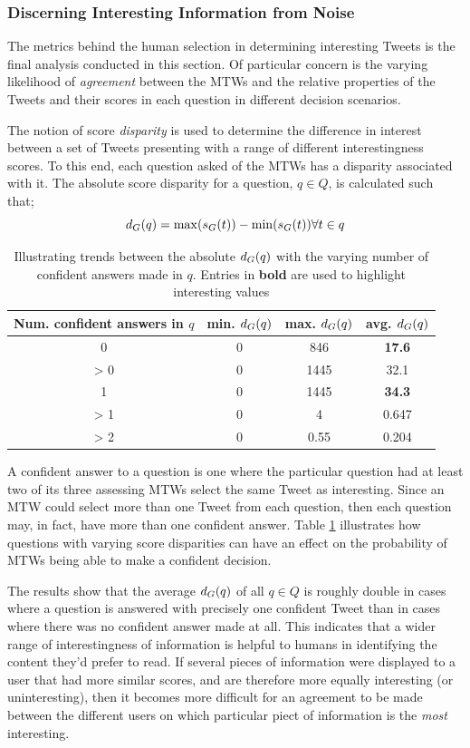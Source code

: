 \subsubsection{Discerning Interesting Information from Noise}
The metrics behind the human selection in determining interesting Tweets is the final analysis conducted in this section. Of particular concern is the varying likelihood of \textit{agreement} between the MTWs and the relative properties of the Tweets and their scores in each question in different decision scenarios.

The notion of score \textit{disparity} is used to determine the difference in interest between a set of Tweets presenting with a range of different interestingness scores. To this end, each question asked of the MTWs has a disparity associated with it. The absolute score disparity for a question, $q \in Q$, is calculated such that;
\[
    d_G(q) = \max(s_G(t)) - \min(s_G(t)) \forall t \in q
\]

\begin{table}[h]\footnotesize
\centering
\begin{tabular}{ c | c | c | c }
	 Num. confident answers in $q$ & min. $d_G(q)$ & max. $d_G(q)$ & avg. $d_G(q)$ \\
	 \hline
     \hline
	0 & 0 & 846 & \textbf{17.6} \\
	> 0 & 0 & 1445 & 32.1 \\
	1 & 0 & 1445 & \textbf{34.3} \\
	> 1 & 0 & 4 & 0.647 \\
	> 2 & 0 & 0.55 & 0.204\\
     \hline
\end{tabular}
\caption{Illustrating trends between the absolute $d_G(q)$ with the varying number of confident answers made in $q$. Entries in \textbf{bold} are used to highlight interesting values}
\label{table:score_disparities}
\end{table}

A confident answer to a question is one where the particular question had at least two of its three assessing MTWs select the same Tweet as interesting. Since an MTW could select more than one Tweet from each question, then each question may, in fact, have more than one confident answer. Table \ref{table:score_disparities} illustrates how questions with varying score disparities can have an effect on the probability of MTWs being able to make a confident decision.

The results show that the average $d_G(q)$ of all $q \in Q$ is roughly double in cases where a question is answered with precisely one confident Tweet than in cases where there was no confident answer made at all. This indicates that a wider range of interestingness of information is helpful to humans in identifying the content they'd prefer to read. If several pieces of information were displayed to a user that had more similar scores, and are therefore more equally interesting (or uninteresting), then it becomes more difficult for an agreement to be made between the different users on which particular piect of information is the \textit{most} interesting.

